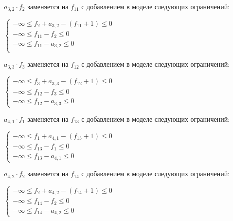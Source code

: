 \begin{enumerate}
  $a_{3, 2} \cdot f_{2}$ заменяется на $f_{11}$ с добавлением в моделе следующих ограничений:
  \begin{center}
    $
      \begin{cases}
        -\infty \le f_{2} + a_{3,2} - (f_{11} + 1) \le 0 \\ %
        -\infty \le f_{11} - f_{2} \le 0 \\ %
        -\infty \le f_{11} - a_{3,2} \le 0 \\ %
      \end{cases}
    $
  \end{center}

  $a_{3, 3} \cdot f_{3}$ заменяется на $f_{12}$ с добавлением в моделе следующих ограничений:
  \begin{center}
    $
      \begin{cases}
        -\infty \le f_{3} + a_{3,3} - (f_{12} + 1) \le 0 \\ %
        -\infty \le f_{12} - f_{3} \le 0 \\ %
        -\infty \le f_{12} - a_{3,3} \le 0 %
      \end{cases}
    $
  \end{center}

  $a_{4, 1} \cdot f_{1}$ заменяется на $f_{13}$ с добавлением в моделе следующих ограничений:
  \begin{center}
    $
      \begin{cases}
        -\infty \le f_{1} + a_{4,1} - (f_{13} + 1) \le 0 \\ %
        -\infty \le f_{13} - f_{1} \le 0 \\ %
        -\infty \le f_{13} - a_{4,1} \le 0 %
      \end{cases}
    $
  \end{center}

  $a_{4, 2} \cdot f_{2}$ заменяется на $f_{14}$ с добавлением в моделе следующих ограничений:
  \begin{center}
    $
      \begin{cases}
        -\infty \le f_{2} + a_{4,2} - (f_{14} + 1) \le 0 \\ %
        -\infty \le f_{14} - f_{2} \le 0 \\ %
        -\infty \le f_{14} - a_{4,2} \le 0 %
      \end{cases}
    $
  \end{center}


\end{enumerate}

